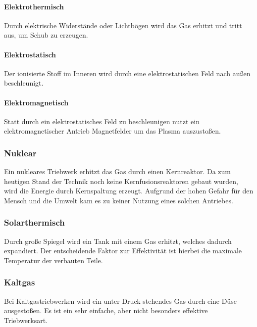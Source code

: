 \documentclass[12pt,a4paper]{article}
\begin{document}
\paragraph{Elektrothermisch}
Durch elektrische Widerstände oder Lichtbögen wird das Gas erhitzt und tritt aus, um Schub zu erzeugen.
\paragraph{Elektrostatisch}
Der ionisierte Stoff im Inneren wird durch eine elektrostatischen Feld nach außen beschleunigt.
\paragraph{Elektromagnetisch}
Statt durch ein elektrostatisches Feld zu beschleunigen nutzt ein elektromagnetischer Antrieb Magnetfelder um das Plasma auszustoßen.
\subsubsection{Nuklear}
Ein nukleares Triebwerk erhitzt das Gas durch einen Kernreaktor. Da zum heutigen Stand der Technik noch keine Kernfusionsreaktoren gebaut wurden, wird die Energie durch Kernspaltung erzeugt. Aufgrund der hohen Gefahr für den Mensch und die Umwelt kam es zu keiner Nutzung eines solchen Antriebes.
\subsubsection{Solarthermisch}
Durch große Spiegel wird ein Tank mit einem Gas erhitzt, welches dadurch expandiert. Der entscheidende Faktor zur Effektivität ist hierbei die maximale Temperatur der verbauten Teile.
\subsubsection{Kaltgas}
Bei Kaltgastriebwerken wird ein unter Druck stehendes Gas durch eine Düse ausgestoßen. Es ist ein sehr einfache, aber nicht besonders effektive Triebwerksart.
\end{document}
